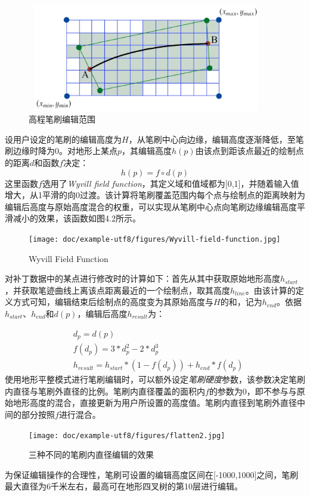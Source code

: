 \begin{figure}[ht]
    \centering
    \includegraphics[height=4.7cm ,width=10.45cm]{figures/editArea.jpg}
  \caption{高程笔刷编辑范围}
  \end{figure}
设用户设定的笔刷的编辑高度为$H$，从笔刷中心向边缘，编辑高度逐渐降低，至笔刷边缘时降为0。对地形上某点$p$，其编辑高度$h(p)$由该点到距该点最近的绘制点的距离$d$和函数$f$决定：
\begin{equation}
h(p) = f \circ d(p)
\end{equation}
这里函数$f$选用了\textit{Wyvill field function}\supercite{wyvill}，其定义域和值域都为[0,1]，并随着输入值增大，从1平滑的向0过渡。该计算将笔刷覆盖范围内每个点与绘制点的距离映射为编辑后高度与原始高度混合的权重，可以实现从笔刷中心点向笔刷边缘编辑高度平滑减小的效果，该函数如图4.2所示。\par
\begin{figure}[ht]
\centering
\texttt{[image: doc/example-utf8/figures/Wyvill-field-function.jpg]}
\caption{Wyvill Field Function\supercite{wyvill}}
\end{figure}
对补丁数据中的某点进行修改时的计算如下：首先从其中获取原始地形高度$h_{start}$，并获取笔迹曲线上离该点距离最近的一个绘制点，取其高度$h_{line}$。由该计算的定义方式可知，编辑结束后绘制点的高度变为其原始高度与$H$的和，记为$h_{end}$。依据$h_{start}$、$h_{end}$和$d(p)$，编辑后高度$h_{result}$为：\par
\begin{equation}
\begin{aligned}
&  d_p=d(p)\\
& f(d_p) = 3 * d_p^2 - 2 * d_p^3\\
&h_{result}=h_{start} * (1 - f(d_p)) + h_{end} * f(d_p)
\end{aligned}
\end{equation}
使用地形平整模式进行笔刷编辑时，可以额外设定\textit{笔刷硬度}参数，该参数决定笔刷内直径与笔刷外直径的比例。笔刷内直径覆盖的面积内$f$的参数为0，即不参与与原始地形高度的混合，直接更新为用户所设置的高度值。笔刷内直径到笔刷外直径中间的部分按照$f$进行混合。\par
\begin{figure}[ht]
\centering
\texttt{[image: doc/example-utf8/figures/flatten2.jpg]}
\caption{三种不同的笔刷内直径编辑的效果}
\end{figure}
为保证编辑操作的合理性，笔刷可设置的编辑高度区间在[-1000,1000]之间，笔刷最大直径为6千米左右，最高可在地形四叉树的第10层进行编辑。
